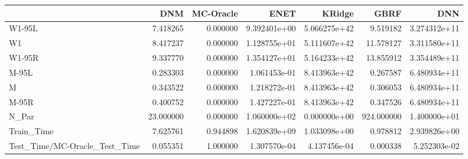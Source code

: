 \begin{tabular}{lrrrrrr}
\toprule
{} &        DNM &  MC-Oracle &          ENET &        KRidge &        GBRF &           DNN \\
\midrule
W1-95L                        &   7.418265 &   0.000000 &  9.392401e+00 &  5.066275e+42 &    9.519182 &  3.274312e+11 \\
W1                            &   8.417237 &   0.000000 &  1.128755e+01 &  5.111607e+42 &   11.578127 &  3.311580e+11 \\
W1-95R                        &   9.337770 &   0.000000 &  1.354127e+01 &  5.164233e+42 &   13.855912 &  3.354489e+11 \\
M-95L                         &   0.283303 &   0.000000 &  1.061453e-01 &  8.413963e+42 &    0.267587 &  6.480934e+11 \\
M                             &   0.343522 &   0.000000 &  1.218272e-01 &  8.413963e+42 &    0.306053 &  6.480934e+11 \\
M-95R                         &   0.400752 &   0.000000 &  1.427227e-01 &  8.413963e+42 &    0.347526 &  6.480934e+11 \\
N\_Par                         &  23.000000 &   0.000000 &  1.060000e+02 &  0.000000e+00 &  924.000000 &  1.400000e+01 \\
Train\_Time                    &   7.625761 &   0.944898 &  1.620839e+09 &  1.033098e+00 &    0.978812 &  2.939826e+00 \\
Test\_Time/MC-Oracle\_Test\_Time &   0.055351 &   1.000000 &  1.307570e-04 &  4.137456e-04 &    0.000338 &  5.252303e-02 \\
\bottomrule
\end{tabular}
